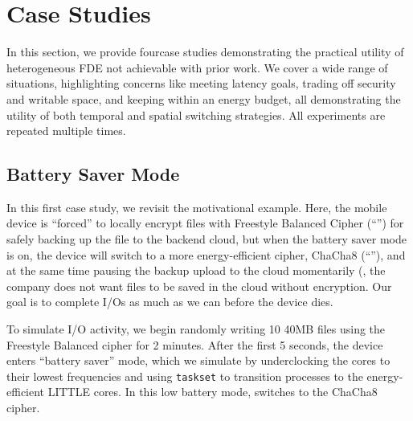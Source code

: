 \section{Case Studies}\label{sec:usecases}

In this section, we provide four\xxx case studies demonstrating the practical
utility of heterogeneous FDE not achievable with prior work. We cover a wide
range of situations, highlighting concerns like meeting latency goals, trading
off security and writable space, and keeping within an energy budget, all
demonstrating the utility of both temporal and spatial switching strategies. All
experiments are repeated multiple times.


\subsection{Battery Saver Mode}\label{subsec:uc1}

In this first case study, we revisit the motivational example.  Here, the mobile
device is ``forced'' to locally encrypt files with Freestyle Balanced Cipher
(``\cone'') for safely backing up the file to the backend cloud, but when the
battery saver mode is on, the device will switch to a more energy-efficient
cipher, ChaCha8 (``\ctwo''), and at the same time pausing the backup upload to
the cloud momentarily (\eg, the company does not want files to be saved in the
cloud without \cone encryption. Our goal is to complete I/Os as much as we can
before the device dies.

To simulate I/O activity, we begin randomly writing 10 40MB files using the
Freestyle Balanced cipher for 2 minutes.  After the first 5 seconds, the device
enters ``battery saver'' mode, which we simulate by underclocking the cores to
their lowest frequencies and using \texttt{taskset} to transition \sys processes
to the energy-efficient LITTLE cores.  In this low battery mode, \sys switches
to the ChaCha8 cipher.



